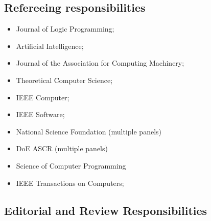 \documentclass{article}
\begin{document}
\subsection*{Refereeing responsibilities}
\begin{itemize}
\item  Journal of Logic Programming; 
\item  Artificial Intelligence; 
\item  Journal of the Association for Computing Machinery; 
\item  Theoretical Computer Science; 
\item  IEEE Computer;
\item  IEEE Software;
\item National Science Foundation (multiple panels)
\item DoE ASCR (multiple panels)
\item Science of Computer Programming
\item IEEE Transactions on Computers;
\end{itemize}

\subsection*{Editorial and Review Responsibilities}
\end{document}

